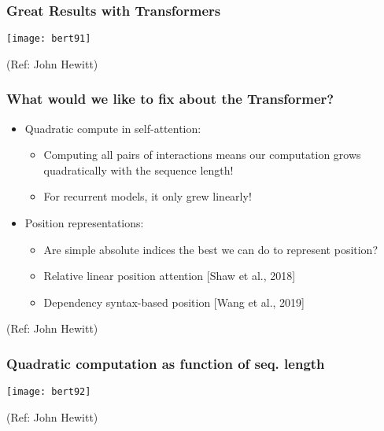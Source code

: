 \begin{frame}[fragile]\frametitle{Great Results with Transformers}

			
			\begin{center}
			\texttt{[image: bert91]}
			\end{center}		
			
			{\tiny (Ref: John Hewitt)}

\end{frame}

\begin{frame}[fragile]\frametitle{What would we like to fix about the Transformer?}

      \begin{itemize}
			\item Quadratic compute in self-attention:
			      \begin{itemize}
						\item Computing all pairs of interactions means our computation grows quadratically with the sequence length!
						\item For recurrent models, it only grew linearly!
						\end{itemize}
			\item Position representations:
			      \begin{itemize}
						\item Are simple absolute indices the best we can do to represent position?
						\item Relative linear position attention [Shaw et al., 2018]
						\item Dependency syntax-based position [Wang et al., 2019]			
						\end{itemize}
			\end{itemize}

			{\tiny (Ref: John Hewitt)}

\end{frame}

\begin{frame}[fragile]\frametitle{Quadratic computation as function of seq. length}

			
			\begin{center}
			\texttt{[image: bert92]}
			\end{center}		
			
			{\tiny (Ref: John Hewitt)}

\end{frame}

